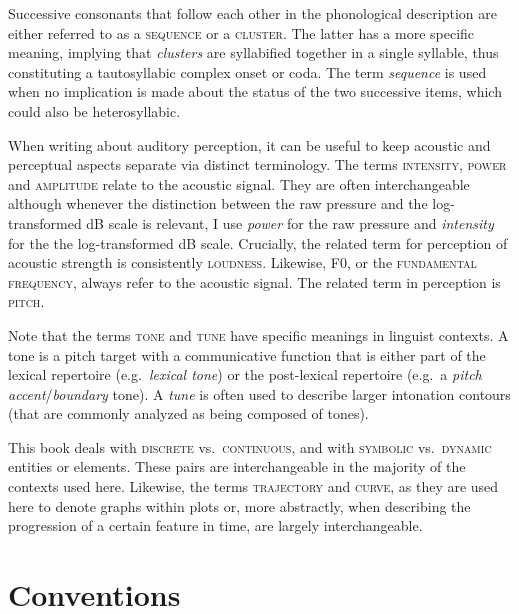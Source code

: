 Successive consonants that follow each other in the phonological description are either referred to as a \textsc{sequence} or a \textsc{cluster}. The latter has a more specific meaning, implying that \emph{clusters} are syllabified together in a single syllable, thus constituting a tautosyllabic complex onset or coda. The term \emph{sequence} is used when no implication is made about the status of the two successive items, which could also be heterosyllabic.

When writing about auditory perception, it can be useful to keep acoustic and perceptual aspects separate via distinct terminology. The terms \textsc{intensity}, \textsc{power} and \textsc{amplitude} relate to the acoustic signal. They are often interchangeable although whenever the distinction between the raw pressure and the log-transformed dB scale is relevant, I use \emph{power} for the raw pressure and \emph{intensity} for the the log-transformed dB scale. Crucially, the related term for perception of acoustic strength is consistently \textsc{loudness}.
Likewise, F0, or the \textsc{fundamental frequency}, always refer to the acoustic signal. The related term in perception is \textsc{pitch}.

Note that the terms \textsc{tone} and \textsc{tune} have specific meanings in linguist contexts. A tone is a pitch target with a communicative function that is either part of the lexical repertoire (e.g.~\emph{lexical tone}) or the post-lexical repertoire (e.g.~a \emph{pitch accent}/\emph{boundary} tone). A \emph{tune} is often used to describe larger intonation contours (that are commonly analyzed as being composed of tones).

This book deals with \textsc{discrete} vs.~\textsc{continuous}, and with \textsc{symbolic} vs.~\textsc{dynamic} entities or elements. These pairs are interchangeable in the majority of the contexts used here.
Likewise, the terms \textsc{trajectory} and \textsc{curve}, as they are used here to denote graphs within plots or, more abstractly, when describing the progression of a certain feature in time, are largely interchangeable.


\section{Conventions}\label{conventions}

